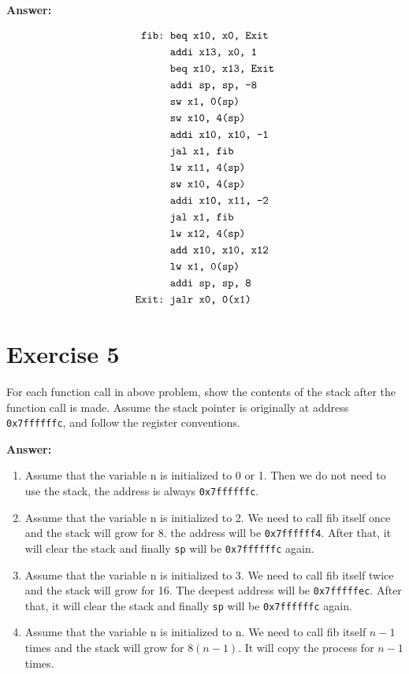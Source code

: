 \documentclass[11pt,a4paper]{article}
\begin{document}
\vspace{0.3cm}

\textbf{Answer:}



$$
\begin{aligned}
\verb|fib: | & \verb|beq x10, x0, Exit|\\
&\verb|addi x13, x0, 1|\\
&\verb|beq x10, x13, Exit|\\
&\verb|addi sp, sp, -8|\\
&\verb|sw x1, 0(sp)|\\
&\verb|sw x10, 4(sp)|\\
&\verb|addi x10, x10, -1|\\
&\verb|jal x1, fib|\\
&\verb|lw x11, 4(sp)|\\
&\verb|sw x10, 4(sp)|\\
&\verb|addi x10, x11, -2|\\
&\verb|jal x1, fib |\\
&\verb|lw x12, 4(sp) |\\
&\verb|add x10, x10, x12 |\\
&\verb|lw x1, 0(sp) |\\
&\verb|addi sp, sp, 8 |\\
\verb|Exit: | & \verb|jalr x0, 0(x1)|\\
\end{aligned}
$$







\section*{Exercise 5}
For each function call in above problem, show the contents of the stack after the function call is made. Assume the stack pointer is originally at address \verb|0x7ffffffc|, and follow the register conventions.

\vspace{0.3cm}

\textbf{Answer:}

\begin{enumerate}
    \item Assume that the variable n is initialized to 0 or 1. Then we do not need to use the stack, the address is always \verb|0x7ffffffc|.
    \item Assume that the variable n is initialized to 2. We need to call fib itself once and the stack will grow for 8. the address will be \verb|0x7ffffff4|. After that, it will clear the stack and finally \verb|sp| will be \verb|0x7ffffffc| again.
    \item Assume that the variable n is initialized to 3. We need to call fib itself twice and the stack will grow for 16. The deepest address will be \verb|0x7fffffec|. After that, it will clear the stack and finally \verb|sp| will be \verb|0x7ffffffc| again.
    \item Assume that the variable n is initialized to n. We need to call fib itself $n-1$ times and the stack will grow for $8(n-1)$. It will copy the process for $n-1$ times.
\end{enumerate}
\end{document}
